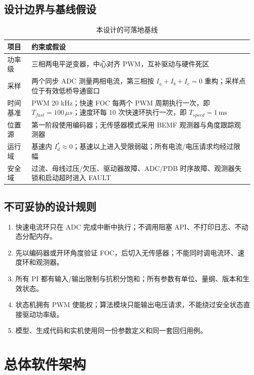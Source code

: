\documentclass[UTF8,a4paper,11pt,fontset=windows]{ctexart}
\begin{document}
\subsection{设计边界与基线假设}
\begin{table}[h]
\centering
\caption{本设计的可落地基线}
\begin{tabularx}{\textwidth}{p{}Y}
\toprule
项目 & 约束或假设 \\
\midrule
功率级 & 三相两电平逆变器，中心对齐 PWM，互补驱动与硬件死区 \\
采样 & 两个同步 ADC 测量两相电流，第三相按 $I_a+I_b+I_c=0$ 重构；采样点位于有效低桥导通窗口 \\
时间基准 & PWM 20 kHz；快速 FOC 每两个 PWM 周期执行一次，即 $T_{fast}=100\,\mu s$；速度环每 10 次快速环执行一次，即 $T_{speed}=1\,\mathrm{ms}$ \\
位置源 & 第一阶段使用编码器；无传感器模式采用 BEMF 观测器与角度跟踪观测器 \\
运行域 & 基速内 $I_d^*\approx0$；基速以上进入受限弱磁；所有电流/电压请求均经过限幅 \\
安全域 & 过流、母线过压/欠压、驱动器故障、ADC/PDB 时序故障、观测器失锁和启动超时进入 FAULT \\
\bottomrule
\end{tabularx}
\end{table}
\subsection{不可妥协的设计规则}
\begin{enumerate}
\item 快速电流环只在 ADC 完成中断中执行；不调用阻塞 API、不打印日志、不动态分配内存。
\item 先以编码器或开环角度验证 FOC，后切入无传感器；不能同时调电流环、速度环和观测器。
\item 所有 PI 都有输入/输出限制与抗积分饱和；所有参数有单位、量纲、版本和生效状态。
\item 状态机拥有 PWM 使能权；算法模块只能输出电压请求，不能绕过安全状态直接驱动功率级。
\item 模型、生成代码和实机使用同一份参数定义和同一套回归用例。
\end{enumerate}
\section{总体软件架构}
\end{document}
